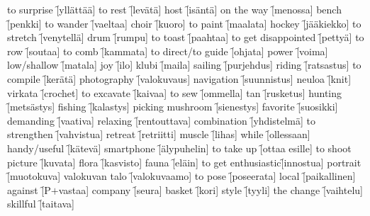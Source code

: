 \begin{questions}
  \begin{multicols}{3}
    \raggedcolumns
    \question to surprise \f[yllättää]
    \question to rest     \f[levätä]
    \question host        \f[isäntä]
    \question on the way  \f[menossa]
    \question bench       \f[penkki]
    \question to wander   \f[vaeltaa]
    \question choir       \f[kuoro]
    \question to paint    \f[maalata]
    \question hockey      \f[jääkiekko]
    \question to stretch  \f[venytellä]
    \question drum        \f[rumpu]
    \question to toast    \f[paahtaa]
    \question to get disappointed     \f[pettyä]
    \question to row                  \f[soutaa]
    \question to comb                 \f[kammata]
    \question to direct/to guide      \f[ohjata]
    \question power                   \f[voima]
    \question low/shallow             \f[matala]
    \question joy                     \f[ilo]
    \question klubi                   \f[maila]
    \question sailing                 \f[purjehdus]
    \question riding                  \f[ratsastus]
    \question to compile              \f[kerätä]
    \question photography             \f[valokuvaus]
    \question navigation              \f[suunnistus]
    \question neuloa                  \f[knit]
    \question virkata                 \f[crochet]
    \question to excavate             \f[kaivaa]
    \question to sew                  \f[ommella]
    \question tan                \f[rusketus]
    \question hunting            \f[metsästys]
    \question fishing            \f[kalastys]
    \question picking mushroom   \f[sienestys]
    \question favorite           \f[suosikki]
    \question demanding          \f[vaativa]
    \question relaxing           \f[rentouttava]
    \question combination        \f[yhdistelmä]
    \question to strengthen      \f[vahvistua]
    \question retreat            \f[retriitti]
    \question muscle             \f[lihas]
    \question while              \f[ollessaan]
    \question handy/useful       \f[kätevä]
    \question smartphone         \f[älypuhelin]
    \question to take up         \f[ottaa esille]
    \question to shoot picture   \f[kuvata]
    \question flora              \f[kasvisto]
    \question fauna              \f[eläin]
    \question to get enthusiastic\f[innostua]
    \question portrait           \f[muotokuva]
    \question valokuvan talo     \f[valokuvaamo]
    \question to pose            \f[poseerata]
    \question local              \f[paikallinen]
    \question against            \f[P$+$vastaa]
    \question company            \f[seura]
    \question basket             \f[kori]
    \question style              \f[tyyli]
    \question the change         \f[vaihtelu]
    \question skillful           \f[taitava]
  \end{multicols}
\end{questions}
